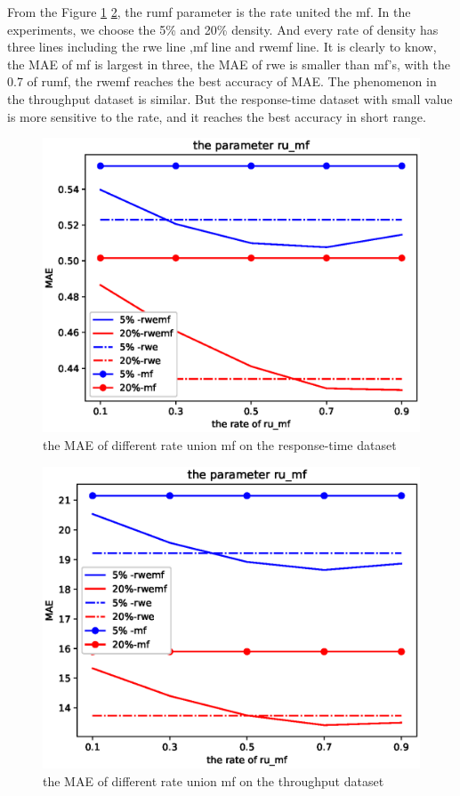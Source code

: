 \documentclass[conference]{IEEEtran}
\begin{document}
\par From the Figure \ref{fig_rumf_rt} \ref{fig_rumf_tp}, the rumf parameter is the rate united the mf. In the experiments, we choose the 5\% and 20\% density. And every rate of density has three lines including the rwe line ,mf line and rwemf line. It is clearly to know, the MAE of mf is largest in three, the MAE of rwe is smaller than mf's, with the 0.7 of rumf, the rwemf reaches the best accuracy of MAE. The phenomenon in the throughput dataset is similar. But the response-time dataset with small value is more sensitive to the rate, and it reaches the best accuracy in short range. 


\begin{figure}[H] 
\centering  
\includegraphics[width=0.45\paperwidth]{rumf_rt.eps}  
\caption{the MAE of different rate union mf on the response-time dataset }  
\label{fig_rumf_rt}  
\end{figure} 

\begin{figure}[H] 
\centering  
\includegraphics[width=0.45\paperwidth]{rumf_tp.eps}  
\caption{the MAE of different rate union mf  on the throughput dataset }  
\label{fig_rumf_tp}  
\end{figure} 
\end{document}
